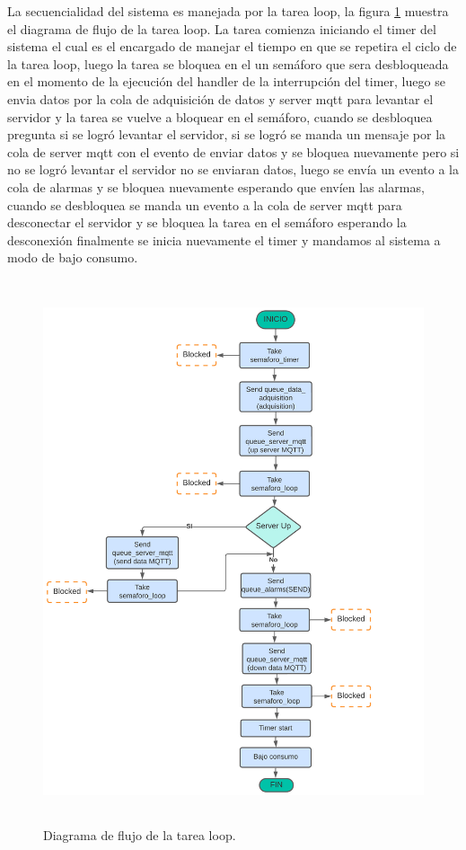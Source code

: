 La secuencialidad del sistema es manejada por la tarea loop, la figura \ref{fig:Df tarea loop sistema} muestra el diagrama de flujo de la tarea loop.
La tarea comienza iniciando el timer del sistema el cual es el encargado de manejar el tiempo en que se repetira el ciclo de la tarea loop, luego la tarea se bloquea en el un semáforo que sera desbloqueada en el momento de la ejecución del handler de la interrupción del timer, luego se envia datos por la cola de adquisición de datos y server mqtt para levantar el servidor y la tarea se vuelve a bloquear en el semáforo, cuando se desbloquea pregunta si se logró levantar el servidor, si se logró se manda un mensaje por la cola de server mqtt con el evento de enviar datos y se bloquea nuevamente pero si no se logró levantar el servidor no se enviaran datos, luego se envía un evento a la cola de alarmas y  se bloquea nuevamente esperando que envíen las alarmas, cuando se desbloquea se manda un evento a la cola de server mqtt para desconectar el servidor y se bloquea la tarea en el semáforo esperando la desconexión  finalmente se inicia nuevamente el timer y mandamos al sistema a modo de bajo consumo.

\begin{figure}[h]  
\centering
	\includegraphics[width=12cm, height=16cm]{./Figures/DF task loop.png}
	\caption{Diagrama de flujo de la tarea loop.}
	\label{fig:Df tarea loop sistema}
\end{figure}

